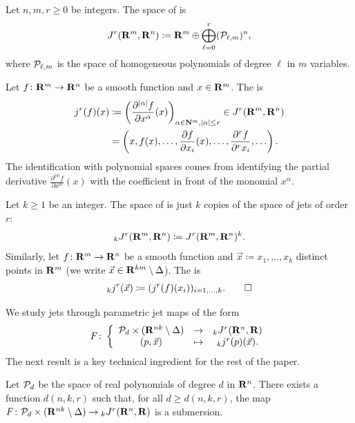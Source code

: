 \begin{definition}
  Let $n, m, r \geq 0$ be integers. The space of  is
  \[
    J^r(\mathbf{R}^m, \mathbf{R}^n) \coloneq \mathbf{R}^m \oplus \bigoplus_{\ell = 0}^r (\mathcal{P}_{\ell, m})^n,
  \]
  where $\mathcal{P}_{\ell, m}$ is the space of homogeneous polynomials of degree $\ell$ in $m$ variables.

  Let $f \colon \mathbf{R}^m \to \mathbf{R}^n$ be a smooth function and $x \in \mathbf{R}^m$. The  is
  \begin{align*}
    j^r(f)(x) & \coloneq \left( \frac{\partial^{|\alpha|} f}{\partial x^\alpha}(x) \right)_{\alpha \in \mathbf{N}^m, |\alpha| \leq r} \in J^r(\mathbf{R}^m, \mathbf{R}^n) \\
    & = \left(x, f(x), \ldots, \frac{\partial f}{\partial x_i}(x), \ldots, \frac{\partial^r f}{\partial^r x_i}, \ldots \right).
  \end{align*}
  The identification with polynomial spaces comes from identifying the partial derivative $\frac{\partial^{|\alpha|} f}{\partial x^\alpha}(x)$ with the coefficient in front of the monomial $x^\alpha$.

  Let $k \geq 1$ be an integer. The space of  is just $k$ copies of the space of jets of order $r$:
  \[
    {}_k J^r(\mathbf{R}^m, \mathbf{R}^n) \coloneq J^r(\mathbf{R}^m, \mathbf{R}^n)^k.
  \]
  Similarly, let $f \colon \mathbf{R}^m \to \mathbf{R}^n$ be a smooth function and $\vec{x} \coloneq x_1, \ldots, x_k$ distinct points in $\mathbf{R}^m$ (we write $\vec{x} \in \mathbf{R}^{km} \setminus \Delta$). The  is
  \[
    {}_k j^r(\vec{x}) \coloneq (j^r(f)(x_i))_{i = 1, \ldots, k}.
    \qedhere
  \]
\end{definition}


We study jets through parametric jet maps of the form
\[
  F \colon \left\{ \begin{array}{ccc}
    \mathcal{P}_d \times (\mathbf{R}^{nk} \setminus \Delta) & \to & {}_k J^r(\mathbf{R}^n, \mathbf{R}) \\
    (p, \vec{x}) & \mapsto & {}_k j^r(p)(\vec x).
  \end{array} \right.
\]
The next result is a key technical ingredient for the rest of the paper.

\begin{theorem}
\label{D!L:submersion}
  Let $\mathcal{P}_d$ be the space of real polynomials of degree $d$ in $\mathbf{R}^n$. There exists a function $d(n, k, r)$ such that, for all $d \geq d(n, k, r)$, the map $F \colon \mathcal{P}_d \times (\mathbf{R}^{nk} \setminus \Delta) \to {}_k J^r(\mathbf{R}^n, \mathbf{R})$ is a submersion.
\end{theorem}

